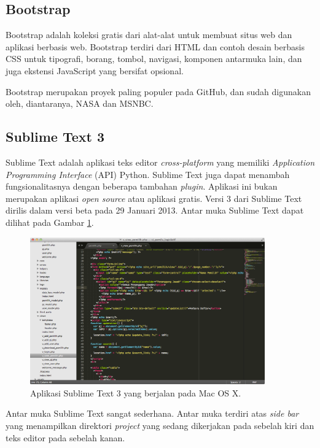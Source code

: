   \subsection{Bootstrap}
    Bootstrap adalah koleksi gratis dari alat-alat untuk membuat situs web dan aplikasi berbasis web. Bootstrap terdiri dari HTML dan contoh desain berbasis CSS untuk tipografi, borang, tombol, navigasi, komponen antarmuka lain, dan juga ekstensi JavaScript yang bersifat opsional.

    Bootstrap merupakan proyek paling populer pada GitHub, dan sudah digunakan oleh, diantaranya, NASA dan MSNBC.

  \subsection{Sublime Text 3}
    Sublime Text adalah aplikasi teks editor \emph{cross-platform} yang memiliki \emph{Application Programming Interface} (API) Python. Sublime Text juga dapat menambah fungsionalitasnya dengan beberapa tambahan \emph{plugin}. Aplikasi ini bukan merupakan aplikasi \emph{open source} atau aplikasi gratis. Versi 3 dari Sublime Text dirilis dalam versi beta pada 29 Januari 2013. Antar muka Sublime Text dapat dilihat pada Gambar \ref{sublime-text}.

      \begin{figure}[ht!]
        \centering
          \includegraphics[width=0.9\textwidth]{gambar/sublime-text}
          \caption{Aplikasi Sublime Text 3 yang berjalan pada Mac OS X.}
          \label{sublime-text}
      \end{figure}
    
    Antar muka Sublime Text sangat sederhana. Antar muka terdiri atas \emph{side bar} yang menampilkan direktori \emph{project} yang sedang dikerjakan pada sebelah kiri dan teks editor pada sebelah kanan.

